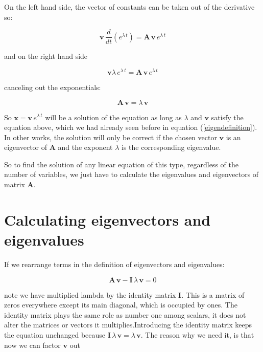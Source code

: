 \documentclass{tufte-book} %
\begin{document}
On the left hand side, the vector of  constants can be taken out of the derivative so:

\begin{equation}
	\mathbf{v} \, \frac{d}{dt} \left(  e^{\lambda \, t} \right)  = \mathbf{A} \, \mathbf{v} \, e^{\lambda \, t}  \nonumber
\end{equation}
 
 and on the right hand side
 
 \begin{equation}
 	\mathbf{v}   \lambda \, e^{\lambda \, t}   = \mathbf{A} \, \mathbf{v} \, e^{\lambda \, t} \nonumber
 \end{equation}
 
canceling out the exponentials:

\begin{equation}
\mathbf{A} \, \mathbf{v}  = \lambda  \,	\mathbf{v}   
\end{equation}
 
So $\mathbf{x}=\mathbf{v} \, e^{\lambda \, t}$ will be a solution of the equation as long as $\lambda$ and $\mathbf{v}$ satisfy the equation above, which we had already seen before in equation (\ref{eigendefinition}). In other works, the solution will only be correct if the chosen vector $\mathbf{v}$ is an eigenvector of $\mathbf{A}$ and the exponent $\lambda$ is the corresponding eigenvalue.

So to find the solution of any linear equation of this type, regardless of the number of variables, we just have to calculate the eigenvalues and eigenvectors of matrix $\mathbf{A}$.

\section{Calculating eigenvectors and eigenvalues}
If we rearrange terms in the definition of eigenvectors and eigenvalues:

\begin{equation}
	\mathbf{A} \, \mathbf{v}  - \mathbf{I} \, \lambda  \,	\mathbf{v}   = 0 \nonumber
\end{equation}

note we have multiplied lambda by the identity matrix $\mathbf{I}$. This is a matrix of zeros everywhere except its main diagonal, which is occupied by ones. The identity matrix plays the same role as number one among scalars, it does not alter the matrices or vectors it multiplies.Introducing the identity matrix keeps the equation unchanged because  $\mathbf{I} \, \lambda  \,	\mathbf{v}  =\lambda  \,	\mathbf{v} $.  The reason why we need it, is that now we can factor $\mathbf{v}$ out 
\end{document}
